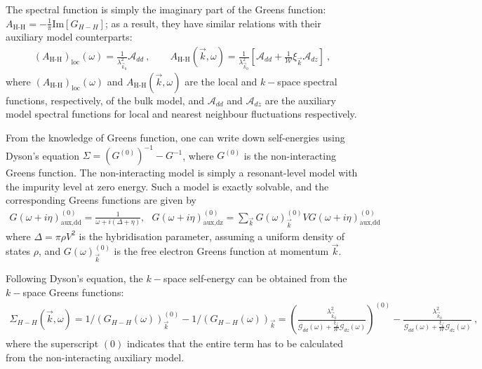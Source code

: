 \documentclass{report}
\numberwithin{equation}{section}
\begin{document}
The spectral function is simply the imaginary part of the Greens function: \(A_\text{H-H} = -\frac{1}{\pi}\text{Im}\left[G_{H-H}\right] \); as a result, they have similar relations with their auxiliary model counterparts:
\begin{equation}\begin{aligned}
	\left(A_\text{H-H}\right)_\text{loc}(\omega) = \frac{1}{\lambda_{\vec k_0}^2}\mathcal{A}_{dd}~,\qquad A_\text{H-H}(\vec{k},\omega) = \frac{1}{\lambda_{\vec k_0}^2}\left[\mathcal{A}_{dd} + \frac{1}{\mathcal{W}}\xi_{\vec k}\mathcal{A}_{dz} \right]~,
\end{aligned}\end{equation}
where \(\left(A_\text{H-H}\right)_\text{loc}(\omega)\) and \(A_\text{H-H}(\vec{k},\omega)\) are the local and \(k-\)space spectral functions, respectively, of the bulk model, and \(\mathcal{A}_{dd}\) and \(\mathcal{A}_{dz}\) are the auxiliary model spectral functions for local and nearest neighbour fluctuations respectively.

From the knowledge of Greens function, one can write down self-energies using Dyson's equation \(\Sigma = \left(G^{(0)}\right)^{-1} - G^{-1}\), where \(G^{(0)}\) is the non-interacting Greens function. The non-interacting model is simply a resonant-level model with the impurity level at zero energy. Such a model is exactly solvable, and the corresponding Greens functions are given by
\begin{equation}\begin{aligned}
	G(\omega + i\eta)_\text{aux,dd}^{(0)} = \frac{1}{\omega + i\left(\Delta + \eta\right)}, ~ ~ ~ G(\omega + i\eta)_\text{aux,dz}^{(0)} = \sum_{\vec k} G(\omega)^{(0)}_{\vec k} V G(\omega + i\eta)_\text{aux,dd}^{(0)}
\end{aligned}\end{equation}
where \(\Delta = \pi \rho V^2\) is the hybridisation parameter, assuming a uniform density of states \(\rho\), and \(G(\omega)^{(0)}_{\vec k}\) is the free electron Greens function at momentum \(\vec k\). 

Following Dyson's equation, the \(k-\)space self-energy can be obtained from the \(k-\)space Greens functions:
\begin{equation}\begin{aligned}
	\label{self-energy1}
	\Sigma_{H-H}(\vec k,\omega) = 1/\left(G_{H-H}(\omega)\right)_{\vec k}^{(0)} - 1/\left(G_{H-H}(\omega)\right)_{\vec k} = \left(\frac{\lambda_{\vec k_0}^2}{\mathcal{G}_{dd}(\omega) + \frac{\xi_{\vec k}}{\mathcal{W}}\mathcal{G}_{dz}(\omega)}\right)^{(0)} - \frac{\lambda_{\vec k_0}^2}{\mathcal{G}_{dd}(\omega) + \frac{\xi_{\vec k}}{\mathcal{W}}\mathcal{G}_{dz}(\omega)}~,
\end{aligned}\end{equation}
where the superscript \((0)\) indicates that the entire term has to be calculated from the non-interacting auxiliary model.
\end{document}
